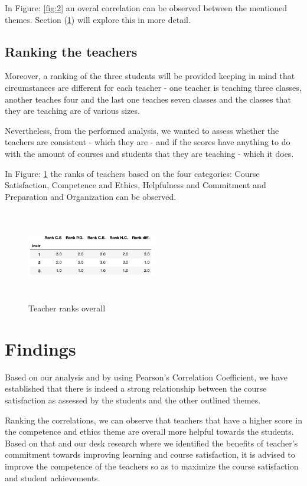 \documentclass[twocolumn]{article}
\begin{document}
In Figure: \ref{fig:2} an overal correlation can be observed between the mentioned themes. Section (\ref{findings}) will explore this in more detail.

    \subsection{Ranking the teachers}
 
 Moreover,  a ranking of the three students will be provided keeping in mind that circumstances are different for each teacher - one teacher is teaching three classes, another teaches four and the last one teaches seven classes and the classes that they are teaching are of various sizes.
 
 Nevertheless, from the performed analysis, we wanted to assess whether the teachers are consistent - which they are - and if the scores have anything to do with the amount of courses and students that they are teaching - which it does.
 
 In Figure: \ref{fig3} the ranks of teachers based on the four categories: Course Satisfaction, Competence and Ethics, Helpfulness and Commitment and Preparation and Organization can be observed.
   
\begin{figure}
  \includegraphics[width=0.5\textwidth,height=4cm]{r.png}
  \caption{Teacher ranks overall}
  \label{fig3}
\end{figure}

\section{Findings} \label{findings}
Based on our analysis and by using Pearson's Correlation Coefficient, we have established that there is indeed a strong relationship between the course satisfaction as assessed by the students and the other outlined themes. 

Ranking the correlations, we can observe that teachers that have a higher score in the competence and ethics theme are overall more helpful towards the students. Based on that and our desk research where we identified the benefits of teacher's commitment towards improving learning and course satisfaction, it is advised to improve the competence of the teachers so as to maximize the course satisfaction and student achievements.
\end{document}
